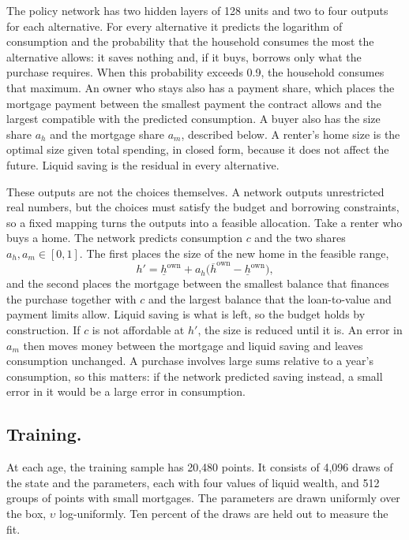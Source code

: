 The policy network has two hidden layers of 128 units and two to four
outputs for each alternative. For every alternative it predicts the
logarithm of consumption and the probability that the household consumes
the most the alternative allows: it saves nothing and, if it buys, borrows
only what the purchase requires. When this probability exceeds 0.9, the
household consumes that maximum. An owner who stays also has a payment
share, which places the mortgage payment between the smallest payment the
contract allows and the largest compatible with the predicted consumption.
A buyer also has the size share $a_h$ and the mortgage share $a_m$,
described below. A renter's home size is the optimal size given total
spending, in closed form, because it does not affect the future. Liquid
saving is the residual in every alternative.

These outputs are not the choices themselves. A network outputs
unrestricted real numbers, but the choices must satisfy the budget and
borrowing constraints, so a fixed mapping turns the outputs into a feasible
allocation. Take a renter who buys a home. The network predicts
consumption $c$ and the two shares $a_h,a_m\in[0,1]$. The first places the
size of the new home in the feasible range,
\begin{equation*}
  h'=\underline h^{\mathrm{own}}
  +a_h\bigl(\overline h^{\mathrm{own}}-\underline h^{\mathrm{own}}\bigr),
\end{equation*}
and the second places the mortgage between the smallest balance that
finances the purchase together with $c$ and the largest balance that the
loan-to-value and payment limits allow. Liquid saving is what is left, so
the budget holds by construction. If $c$ is not affordable at $h'$, the
size is reduced until it is. An error in $a_m$ then moves money between the
mortgage and liquid saving and leaves consumption unchanged. A purchase
involves large sums relative to a year's consumption, so this matters: if
the network predicted saving instead, a small error in it would be a large
error in consumption.

\subsection{Training.}\label{app:computation-training}
At each age, the training sample has 20,480 points. It consists of 4,096
draws of the state and the parameters, each with four values of liquid
wealth, and 512 groups of points with small mortgages. The parameters are
drawn uniformly over the box, $\upsilon$ log-uniformly. Ten percent of the
draws are held out to measure the fit.

